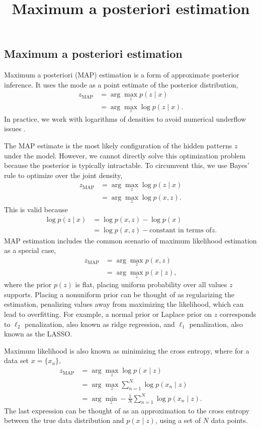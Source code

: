 \title{Maximum a posteriori estimation}

\subsection{Maximum a posteriori estimation}

Maximum a posteriori (MAP) estimation is a form of approximate
posterior inference. It uses the mode as a point estimate of the
posterior distribution,
\begin{align*}
  z_\text{MAP}
  &=
  \arg \max_z
  p(z \mid x)\\
  &=
  \arg \max_z
  \log p(z \mid x).
\end{align*}
In practice, we work with logarithms of densities to avoid numerical underflow
issues \citep{murphy2012machine}.

The MAP estimate is the most likely configuration of the hidden patterns $z$
under the model. However, we cannot directly solve this optimization problem
because the posterior is typically intractable. To circumvent this, we use Bayes' rule to
optimize over the joint density,
\begin{align*}
  z_\text{MAP}
  &=
  \arg \max_z
  \log p(z \mid x)\\
  &=
  \arg \max_z
  \log p(x, z).
\end{align*}
This is valid because
\begin{align*}
  \log p(z \mid x)
  &=
  \log p(x, z) - \log p(x)\\
  &=
  \log p(x, z) - \text{constant in terms of} z.
\end{align*}
MAP estimation includes the common scenario of maximum
likelihood estimation as a special case,
\begin{align*}
  z_\text{MAP}
  &=
  \arg \max_z
  p(x, z)\\
  &=
  \arg \max_z
  p(x\mid z),
\end{align*}
where the prior $p(z)$ is flat, placing uniform probability over all
values $z$ supports. Placing a nonuniform prior can be thought of as
regularizing the estimation, penalizing values away from maximizing
the likelihood, which can lead to overfitting. For example, a normal
prior or Laplace prior on $z$ corresponds to $\ell_2$ penalization, also
known as ridge regression, and $\ell_1$ penalization, also
known as the LASSO.

Maximum likelihood is also known as minimizing the cross entropy, where
for a data set $x=\{x_n\}$,
\begin{align*}
  z_\text{MAP}
  &=
  \arg \max_z
  \log p(x\mid z)
  \\
  &=
  \arg \max_z
  \sum_{n=1}^N \log p(x_n\mid z)
  \\
  &=
  \arg \min_z
  -\frac{1}{N}\sum_{n=1}^N \log p(x_n\mid z).
\end{align*}
The last expression can be thought of as an approximation to the cross
entropy between the true data distribution and $p(x\mid z)$,
using a set of $N$ data points.

